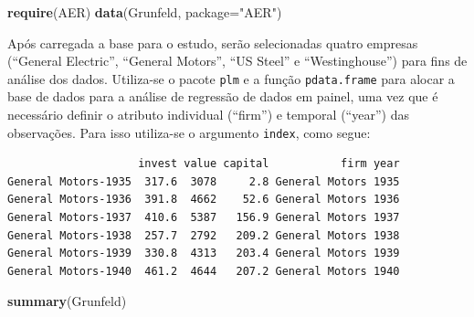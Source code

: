 \documentclass[12pt,brazil,oneside]{book}
\newenvironment{Shaded}{\begin{snugshade}}{\end{snugshade}}
\newcommand{\DataTypeTok}[1]{\textcolor[rgb]{0.13,0.29,0.53}{#1}}
\newcommand{\KeywordTok}[1]{\textcolor[rgb]{0.13,0.29,0.53}{\textbf{#1}}}
\newcommand{\NormalTok}[1]{#1}
\newcommand{\OperatorTok}[1]{\textcolor[rgb]{0.81,0.36,0.00}{\textbf{#1}}}
\newcommand{\StringTok}[1]{\textcolor[rgb]{0.31,0.60,0.02}{#1}}
\begin{document}
\begin{Shaded}
\begin{Highlighting}[]
\KeywordTok{require}\NormalTok{(AER) }
\KeywordTok{data}\NormalTok{(Grunfeld, }\DataTypeTok{package=}\StringTok{"AER"}\NormalTok{)}
\end{Highlighting}
\end{Shaded}

Após carregada a base para o estudo, serão selecionadas quatro empresas (``General Electric'', ``General Motors'', ``US Steel'' e ``Westinghouse'') para fins de análise dos dados. Utiliza-se o pacote \texttt{plm} e a função \texttt{pdata.frame} para alocar a base de dados para a análise de regressão de dados em painel, uma vez que é necessário definir o atributo individual (``firm'') e temporal (``year'') das observações. Para isso utiliza-se o argumento \texttt{index}, como segue:

\begin{Shaded}
\end{Shaded}

\begin{verbatim}
                    invest value capital           firm year
General Motors-1935  317.6  3078     2.8 General Motors 1935
General Motors-1936  391.8  4662    52.6 General Motors 1936
General Motors-1937  410.6  5387   156.9 General Motors 1937
General Motors-1938  257.7  2792   209.2 General Motors 1938
General Motors-1939  330.8  4313   203.4 General Motors 1939
General Motors-1940  461.2  4644   207.2 General Motors 1940
\end{verbatim}

\begin{Shaded}
\begin{Highlighting}[]
\KeywordTok{summary}\NormalTok{(Grunfeld)}
\end{Highlighting}
\end{Shaded}
\end{document}
